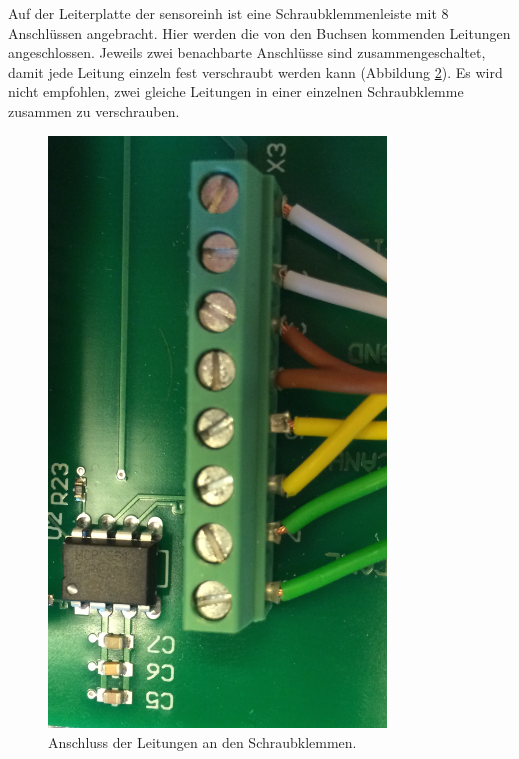 \begin{figure}
\begin{minipage}{0.5\textwidth}
	\label{fig.polstecker}
\end{minipage}
\end{figure}

Auf der Leiterplatte der \gls{sensoreinh} ist eine Schraubklemmenleiste mit 8 Anschlüssen angebracht. Hier werden die von den Buchsen kommenden Leitungen angeschlossen. Jeweils zwei benachbarte Anschlüsse sind zusammengeschaltet, damit jede Leitung einzeln fest verschraubt werden kann (Abbildung \ref{fig.kabel}). Es wird nicht empfohlen, zwei gleiche Leitungen in einer einzelnen Schraubklemme zusammen zu verschrauben.

\begin{figure}
	\centering
		\includegraphics[width=0.8\textwidth]{images/AnschlussKabel.png}
	\caption{Anschluss der Leitungen an den Schraubklemmen.}
	\label{fig.kabel}
\end{figure}









